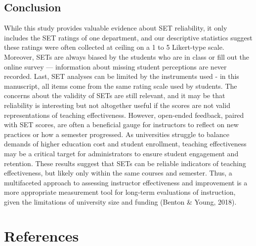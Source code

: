 \documentclass[
  man,mask]{apa7}
\begin{document}
\subsection{Conclusion}\label{conclusion}

While this study provides valuable evidence about SET reliability, it
only includes the SET ratings of one department, and our descriptive
statistics suggest these ratings were often collected at ceiling on a 1
to 5 Likert-type scale. Moreover, SETs are always biased by the students
who are in class or fill out the online survey --- information about
missing student perceptions are never recorded. Last, SET analyses can
be limited by the instruments used - in this manuscript, all items come
from the same rating scale used by students. The concerns about the
validity of SETs are still relevant, and it may be that reliability is
interesting but not altogether useful if the scores are not valid
representations of teaching effectiveness. However, open-ended feedback,
paired with SET scores, are often a beneficial gauge for instructors to
reflect on new practices or how a semester progressed. As universities
struggle to balance demands of higher education cost and student
enrollment, teaching effectiveness may be a critical target for
administrators to ensure student engagement and retention. These results
suggest that SETs can be reliable indicators of teaching effectiveness,
but likely only within the same courses and semester. Thus, a
multifaceted approach to assessing instructor effectiveness and
improvement is a more appropriate measurement tool for long-term
evaluations of instruction, given the limitations of university size and
funding (Benton \& Young, 2018).

\newpage

\section{References}\label{references}
\end{document}
